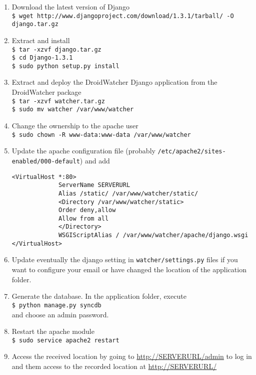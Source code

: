 \documentclass{article}
\begin{document}
\begin{enumerate}
\item Download the latest version of Django\\
  \texttt{\$ wget http://www.djangoproject.com/download/1.3.1/tarball/ -O django.tar.gz}
\item Extract and install\\
  \texttt{\$ tar -xzvf django.tar.gz\\\$ cd Django-1.3.1\\\$ sudo python setup.py install}
\item Extract and deploy the DroidWatcher Django application from the DroidWatcher package\\
  \texttt{\$ tar -xzvf watcher.tar.gz\\\$ sudo mv watcher /var/www/watcher}
\item Change the ownership to the apache user\\
  \texttt{\$ sudo chown -R www-data:www-data /var/www/watcher}
\item Update the apache configuration file (probably \texttt{/etc/apache2/sites-enabled/000-default}) and add
\begin{verbatim}
<VirtualHost *:80>
             ServerName SERVERURL
             Alias /static/ /var/www/watcher/static/
             <Directory /var/www/watcher/static>
             Order deny,allow
             Allow from all
             </Directory>
             WSGIScriptAlias / /var/www/watcher/apache/django.wsgi
</VirtualHost>
\end{verbatim}
\item Update eventually the django setting in \texttt{watcher/settings.py} files if you want to configure your email or have changed the location of the application folder.
\item Generate the database. In the application folder, execute\\
  \texttt{\$ python manage.py syncdb}\\
  and choose an admin password.
\item Restart the apache module\\
  \texttt{\$ sudo service apache2 restart}
\item Access the received location by going to \url{http://SERVERURL/admin} to log in and them access to the recorded location at \url{http://SERVERURL/}
\end{enumerate}
\end{document}
